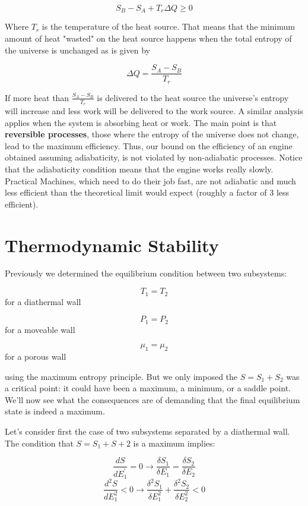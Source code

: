 \documentclass{article}
\newcommand{\pardif}[2]{\frac{\delta#1}{\delta#2}}
\newcommand{\dif}[2]{\frac{d#1}{d#2}}
\begin{document}
$$S_{B}-S_{A}+T_{r}\Delta Q\geq0$$

Where $T_{r}$ is the temperature of the heat source.  That means that the minimum amount of heat "wasted" on the heat source happens when the total entropy of the universe is unchanged as is given by 

$$\Delta Q=\frac{S_{A}-S_{B}}{T_{r}}$$

If more heat than $\frac{S_{A}-S_{B}}{T_{r}}$ is delivered to the heat source the universe's entropy will increase and less work will be delivered to the work source.  A similar analysis applies when the system is absorbing heat or work.  The main point is that \textbf{reversible processes}, those where the entropy of the universe does not change, lead to the maximum efficiency.  Thus, our bound on the efficiency of an engine obtained assuming adiabaticity, is not violated by non-adiabatic processes.  Notice that the adiabaticity condition means that the engine works really slowly.  Practical Machines, which need to do their job fast, are not adiabatic and much less efficient than the theoretical limit would expect (roughly a factor of 3 less efficient).

\section{Thermodynamic Stability}

Previously we determined the equilibrium condition between two subsystems: 

$$T_{1}=T_{2}$$ for a diathermal wall

$$P_{1}=P_{2}$$ for a moveable wall

$$\mu_{1}=\mu_{2}$$ for a porous wall

using the maximum entropy principle.  But we only imposed the $S=S_{1}+S_{2}$ was a critical point: it could have been a maximum, a minimum, or a saddle point.  We'll now see what the consequences are of demanding that the final equilibrium state is indeed a maximum.  

Let's consider first the case of two subsystems separated by a diathermal wall.  The condition that $S=S_{1}+S+{2}$ is a maximum implies:


$$\dif{S}{E_{1}^{'}}=0\rightarrow\pardif{S_{1}}{E_{1}}=\pardif{S_{2}}{E_{2}}$$
$$\frac{d^{2}S}{dE_{1}^{2}}<0\rightarrow\frac{\delta^{2}S_{1}}{\delta E_{1}^{2}}+\frac{\delta^{2}S_{2}}{\delta E_{2}^{2}}<0$$
\end{document}
